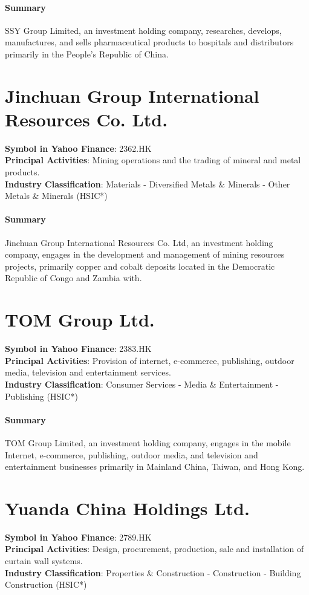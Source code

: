 \paragraph{Summary}
SSY Group Limited, an investment holding company, researches, develops, manufactures, and sells pharmaceutical products to hospitals and distributors primarily in the People's Republic of China.


\section{Jinchuan Group International Resources Co. Ltd.}
\textbf{Symbol in Yahoo Finance}: 2362.HK\\
\textbf{Principal Activities}: Mining operations and the trading of mineral and metal products.\\
\textbf{Industry Classification}: Materials - Diversified Metals \& Minerals - Other Metals \& Minerals (HSIC*)
\paragraph{Summary}
Jinchuan Group International Resources Co. Ltd, an investment holding company, engages in the development and management of mining resources projects, primarily copper and cobalt deposits located in the Democratic Republic of Congo and Zambia with.


\section{TOM Group Ltd.}
\textbf{Symbol in Yahoo Finance}: 2383.HK\\
\textbf{Principal Activities}: Provision of internet, e-commerce, publishing, outdoor media, television and entertainment services.\\
\textbf{Industry Classification}: Consumer Services - Media \& Entertainment - Publishing (HSIC*)
\paragraph{Summary}
TOM Group Limited, an investment holding company, engages in the mobile Internet, e-commerce, publishing, outdoor media, and television and entertainment businesses primarily in Mainland China, Taiwan, and Hong Kong.


\section{Yuanda China Holdings Ltd.}
\textbf{Symbol in Yahoo Finance}: 2789.HK\\
\textbf{Principal Activities}: Design, procurement, production, sale and installation of curtain wall systems.\\
\textbf{Industry Classification}: Properties \& Construction - Construction - Building Construction (HSIC*)
